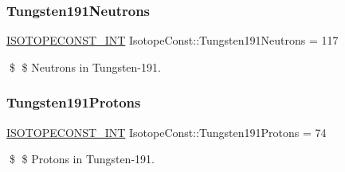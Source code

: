 \subsubsection{\texorpdfstring{Tungsten191\+Neutrons}{Tungsten191Neutrons}}
{\footnotesize\ttfamily \mbox{\hyperlink{group___isotope_const-_macros_ga5f18360b3e99483a35c32d789e62621c}{I\+S\+O\+T\+O\+P\+E\+C\+O\+N\+S\+T\+\_\+\+I\+NT}} Isotope\+Const\+::\+Tungsten191\+Neutrons = 117}

\$ \$ Neutrons in Tungsten-\/191. \mbox{\label{group___isotope_const-_tungsten-_w191_gaae91eeafe450242c982af81bf58c5bf6}} 
\subsubsection{\texorpdfstring{Tungsten191\+Protons}{Tungsten191Protons}}
{\footnotesize\ttfamily \mbox{\hyperlink{group___isotope_const-_macros_ga5f18360b3e99483a35c32d789e62621c}{I\+S\+O\+T\+O\+P\+E\+C\+O\+N\+S\+T\+\_\+\+I\+NT}} Isotope\+Const\+::\+Tungsten191\+Protons = 74}

\$ \$ Protons in Tungsten-\/191. 